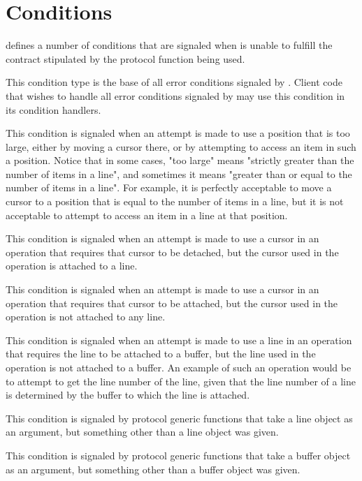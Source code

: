 \section{Conditions}

\sysname{} defines a number of conditions that are signaled when
\sysname{} is unable to fulfill the contract stipulated by the
protocol function being used.


This condition type is the base of all error conditions signaled by
\sysname{}.  Client code that wishes to handle all error conditions
signaled by \sysname{} may use this condition in its condition
handlers.


This condition is signaled when an attempt is made to use a
position that is too large, either by moving a cursor there, or by
attempting to access an item in such a position.  Notice that in
some cases, "too large" means "strictly greater than the number of
items in a line", and sometimes it means "greater than or equal to
the number of items in a line".  For example, it is perfectly
acceptable to move a cursor to a position that is equal to the
number of items in a line, but it is not acceptable to attempt to
access an item in a line at that position.




This condition is signaled when an attempt is made to use a cursor
in an operation that requires that cursor to be detached, but the
cursor used in the operation is attached to a line.


This condition is signaled when an attempt is made to use a cursor
in an operation that requires that cursor to be attached, but the
cursor used in the operation is not attached to any line.


This condition is signaled when an attempt is made to use a line
in an operation that requires the line to be attached to a buffer,
but the line used in the operation is not attached to a buffer.
An example of such an operation would be to attempt to get the
line number of the line, given that the line number of a line is
determined by the buffer to which the line is attached.


This condition is signaled by protocol generic functions that take
a line object as an argument, but something other than a line
object was given.


This condition is signaled by protocol generic functions that take
a buffer object as an argument, but something other than a buffer
object was given.
